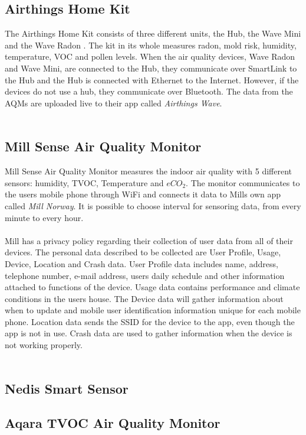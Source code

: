 \subsection{Airthings Home Kit}
The Airthings Home Kit consists of three different units, the Hub, the Wave Mini and the Wave Radon \cite{AirthingsProducts}. The kit in its whole measures radon, mold risk, humidity, temperature, VOC and pollen levels. When the air quality devices, Wave Radon and Wave Mini, are connected to the Hub, they communicate over SmartLink to the Hub and the Hub is connected with Ethernet to the Internet. However, if the devices do not use a hub, they communicate over Bluetooth. The data from the AQMs are uploaded live to their app called \textit{Airthings Wave}. 
\\\\
\subsection{Mill Sense Air Quality Monitor}
Mill Sense Air Quality Monitor measures the indoor air quality with 5 different sensors: humidity, TVOC, Temperature and \(eCO_2\). \cite{Mill} The monitor communicates to the users mobile phone through WiFi and connects it data to Mills own app called \textit{Mill Norway}. It is possible to choose interval for sensoring data, from every minute to every hour. 
\\\\
Mill has a privacy policy regarding their collection of user data from all of their devices. \cite{MillPrivacy} The personal data described to be collected are User Profile, Usage, Device, Location and Crash data. User Profile data includes name, address, telephone number, e-mail address, users daily schedule and other information attached to functions of the device. Usage data contains performance and climate conditions in the users house. The Device data will gather information about when to update and mobile user identification information unique for each mobile phone. Location data sends the SSID for the device to the app, even though the app is not in use. Crash data are used to gather information when the device is not working properly. \cite{MillPrivacy} 
\\\\
\subsection{Nedis Smart Sensor}

\subsection{Aqara TVOC Air Quality Monitor}

